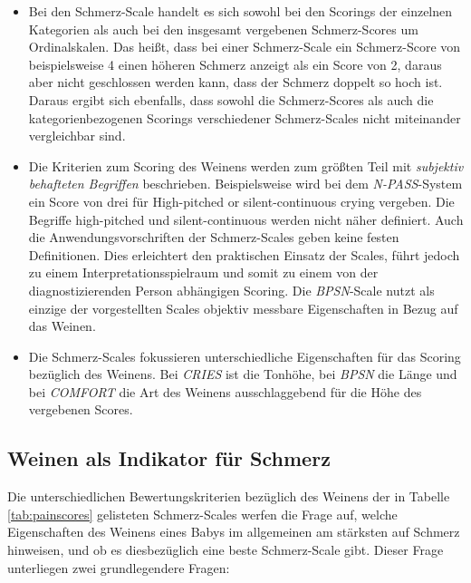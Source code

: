 \begin{itemize}
	
	\item Bei den Schmerz-Scale handelt es sich sowohl bei den Scorings der einzelnen Kategorien als auch bei den insgesamt vergebenen Schmerz-Scores um Ordinalskalen. Das heißt, dass bei einer Schmerz-Scale ein Schmerz-Score von beispielsweise 4 einen höheren Schmerz anzeigt als ein Score von 2, daraus aber nicht geschlossen werden kann, dass der Schmerz doppelt so hoch ist. Daraus ergibt sich ebenfalls, dass sowohl die Schmerz-Scores als auch die kategorienbezogenen Scorings verschiedener Schmerz-Scales nicht miteinander vergleichbar sind.
	
	\item Die Kriterien zum Scoring des Weinens werden zum größten Teil mit \emph{subjektiv behafteten Begriffen} beschrieben. Beispielsweise wird bei dem \emph{N-PASS}-System ein Score von drei für \glqq High-pitched or silent-continuous crying\grqq{} vergeben. Die Begriffe \glqq high-pitched\grqq{} und \glqq silent-continuous\grqq{} werden nicht näher definiert. Auch die Anwendungsvorschriften der Schmerz-Scales geben keine festen Definitionen. Dies erleichtert den praktischen Einsatz der Scales, führt jedoch zu einem Interpretationsspielraum und somit zu einem von der diagnostizierenden Person abhängigen Scoring. Die \emph{BPSN}-Scale nutzt als einzige der vorgestellten Scales objektiv messbare Eigenschaften in Bezug auf das Weinen.
	
	\item Die Schmerz-Scales fokussieren unterschiedliche Eigenschaften für das Scoring bezüglich des Weinens. Bei \emph{CRIES} ist die Tonhöhe, bei \emph{BPSN} die Länge und bei \emph{COMFORT} die Art des Weinens ausschlaggebend für die Höhe des vergebenen Scores.
	
\end{itemize}


\subsection{Weinen als Indikator für Schmerz}
\label{sec:foundations_cryingMeta}

Die unterschiedlichen Bewertungskriterien bezüglich des Weinens der in Tabelle \ref{tab:painscores} gelisteten Schmerz-Scales werfen die Frage auf, welche Eigenschaften des Weinens eines Babys im allgemeinen am stärksten auf Schmerz hinweisen, und ob es diesbezüglich eine \glqq beste\grqq{} Schmerz-Scale gibt. Dieser Frage unterliegen zwei grundlegendere Fragen:

